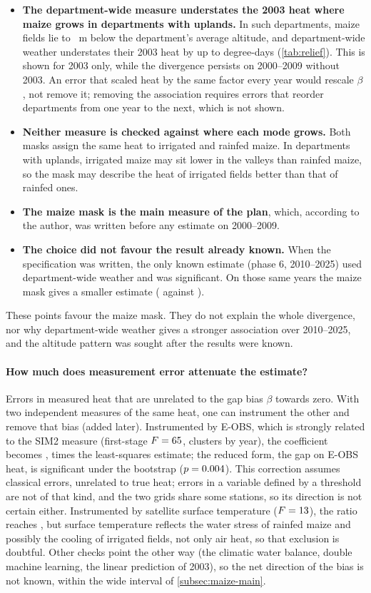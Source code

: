 \begin{itemize}
  \item \textbf{The department-wide measure understates the 2003 heat where maize grows in departments with uplands.} In \ReliefCount{} such departments, maize fields lie \ReliefAltDiffMin{} to \ReliefAltDiffMax{}~m below the department's average altitude, and department-wide weather understates their 2003 heat by up to \ReliefGapMax{} degree-days (\cref{tab:relief}). This is shown for 2003 only, while the divergence persists on 2000--2009 without 2003. An error that scaled heat by the same factor every year would rescale $\beta$, not remove it; removing the association requires errors that reorder departments from one year to the next, which is not shown.
  \item \textbf{Neither measure is checked against where each mode grows.} Both masks assign the same heat to irrigated and rainfed maize. In departments with uplands, irrigated maize may sit lower in the valleys than rainfed maize, so the mask may describe the heat of irrigated fields better than that of rainfed ones.
  \item \textbf{The maize mask is the main measure of the plan}, which, according to the author, was written before any estimate on 2000--2009.
  \item \textbf{The choice did not favour the result already known.} When the specification was written, the only known estimate (phase 6, 2010--2025) used department-wide weather and was significant. On those same years the maize mask gives a smaller estimate (\MaskRecent{} against \AreaRecent).
\end{itemize}
These points favour the maize mask. They do not explain the whole divergence, nor why department-wide weather gives a stronger association over 2010--2025, and the altitude pattern was sought after the results were known.

\paragraph{How much does measurement error attenuate the estimate?} Errors in measured heat that are unrelated to the gap bias $\beta$ towards zero. With two independent measures of the same heat, one can instrument the other and remove that bias (added later). Instrumented by E-OBS, which is strongly related to the SIM2 measure (first-stage $F = 65$, clusters by year), the coefficient becomes \IvEobsBeta, \IvEobsRatio{} times the least-squares estimate; the reduced form, the gap on E-OBS heat, is significant under the bootstrap ($p = 0.004$). This correction assumes classical errors, unrelated to true heat; errors in a variable defined by a threshold are not of that kind, and the two grids share some stations, so its direction is not certain either. Instrumented by satellite surface temperature ($F = 13$), the ratio reaches \IvLstRatio, but surface temperature reflects the water stress of rainfed maize and possibly the cooling of irrigated fields, not only air heat, so that exclusion is doubtful. Other checks point the other way (the climatic water balance, double machine learning, the linear prediction of 2003), so the net direction of the bias is not known, within the wide interval of \cref{subsec:maize-main}.

